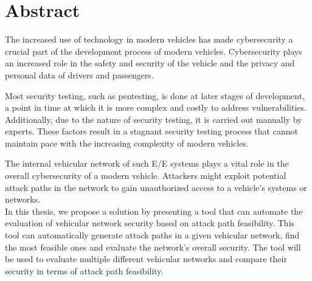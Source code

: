 
\chapter*{Abstract}\label{chp:abstract}

The increased use of technology in modern vehicles has made cybersecurity a crucial part of the development process of modern vehicles.
Cybersecurity plays an increased role in the safety and security of the vehicle and the privacy and personal data of drivers and passengers.

Most security testing, such as pentesting, is done at later stages of development, a point in time at which it is more complex and costly to address vulnerabilities.
Additionally, due to the nature of security testing, it is carried out manually by experts.
These factors result in a stagnant security testing process that cannot maintain pace with the increasing complexity of modern vehicles.

The internal vehicular network of such E/E systems plays a vital role in the overall cybersecurity of a modern vehicle.
Attackers might exploit potential attack paths in the network to gain unauthorized access to a vehicle's systems or networks.\\

In this thesis, we propose a solution by presenting a tool that can automate the evaluation of vehicular network security based on attack path feasibility.
This tool can automatically generate attack paths in a given vehicular network, find the most feasible ones and evaluate the network's overall security.
The tool will be used to evaluate multiple different vehicular networks and compare their security in terms of attack path feasibility.